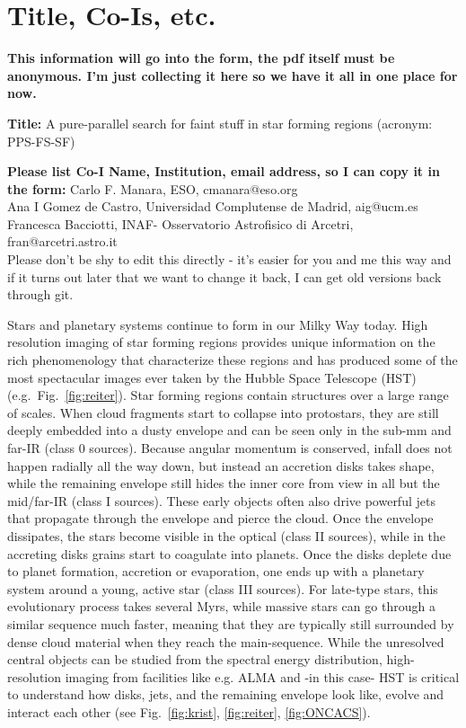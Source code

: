 \documentclass[12pt]{article}
\begin{document}
\section*{Title, Co-Is, etc.}
\textbf{This information will go into the form, the pdf itself must be anonymous. I'm just collecting it here so we have it all in one place for now.}

\textbf{Title:} A pure-parallel search for faint stuff in star forming regions
(acronym: PPS-FS-SF)

\textbf{Please list Co-I Name, Institution, email address, so I can copy it in the form:}
\noindent
Carlo F. Manara, ESO, cmanara@eso.org \\
Ana I Gomez de Castro, Universidad Complutense de Madrid, aig@ucm.es\\
Francesca Bacciotti, INAF- Osservatorio Astrofisico di Arcetri, fran@arcetri.astro.it\\

\vspace{3cm}
Please don't be shy to edit this directly - it's easier for you and me this way and if it turns out later that we want to change it back, I can get old versions back through git.

\pagebreak
%
%
\justification          %
Stars and planetary systems continue to form in our Milky Way today. High resolution imaging of star forming regions provides unique information on the rich phenomenology that characterize these regions and has produced some of the most spectacular images ever taken by
the Hubble Space Telescope (HST) (e.g.\ Fig.~\ref{fig:reiter}). Star forming
regions contain structures over a large range of scales. 
When cloud fragments start to collapse into protostars, they are still deeply
embedded into a dusty envelope and can be seen only in the sub-mm and far-IR (class
0 sources). Because angular momentum is conserved, infall does not happen
radially all the way down, but instead an accretion disks takes shape, while
the remaining envelope still hides the inner core from view in all but the
mid/far-IR (class I sources).  These early objects often also drive powerful jets
that propagate through the envelope and pierce the cloud. Once the envelope
dissipates, the stars become visible in the optical  (class II sources), while in the  accreting disks grains start to coagulate
into planets. Once the disks deplete due to planet formation, accretion or
evaporation, one ends up with a planetary system around a young, active star
(class III sources). For late-type stars, this evolutionary process takes several Myrs,
while massive stars can go through a similar sequence much faster, meaning that
they are typically still surrounded by dense cloud material when they reach the main-sequence.
While the unresolved central objects can be studied from the spectral energy distribution,
high-resolution imaging from facilities like e.g. ALMA and -in this case- HST  is critical to understand how disks, jets, and the remaining envelope
look like, evolve and interact each other (see Fig.~\ref{fig:krist}, \ref{fig:reiter},  \ref{fig:ONCACS}).
\end{document}
